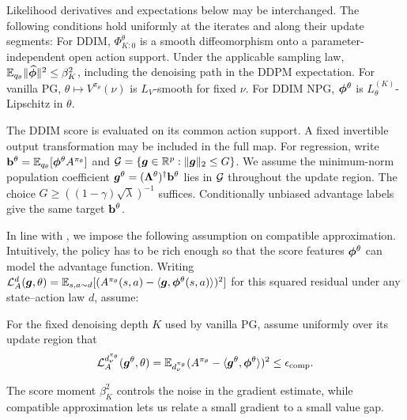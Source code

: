 \begin{aspt}\label{aspt:ddpm-bijection}
Likelihood derivatives and expectations below may be interchanged. The following conditions hold uniformly at the iterates and along their update segments:
For DDIM, $\Phi_{K:0}^\theta$ is a smooth diffeomorphism onto a parameter-independent open action support.
Under the applicable sampling law, $\mathbb{E}_{q_\theta}\|\widehat{\boldsymbol{\phi}}\|^2\leq\beta_K^2$, including the denoising path in the DDPM expectation.
For vanilla PG, $\theta\mapsto V^{\pi_\theta}(\nu)$ is $L_V$-smooth for fixed $\nu$. For DDIM NPG, $\boldsymbol{\phi}^\theta$ is $L^{(K)}_\theta$-Lipschitz in $\theta$.
\end{aspt}
The DDIM score is evaluated on its common action support. A fixed invertible output transformation may be included in the full map.
For regression, write $\mathbf{b}^\theta=\mathbb{E}_{q_\theta}[\boldsymbol{\phi}^\theta A^{\pi_\theta}]$ and ${\mathcal{G}}=\{\bm{g}\in\mathbb R^p:\|\bm{g}\|_2\leq G\}$. We assume the minimum-norm population coefficient $\bm{g}^\theta=(\boldsymbol{\Lambda}^\theta)^\dagger\mathbf{b}^\theta$ lies in ${\mathcal{G}}$ throughout the update region. The choice $G\geq((1-\gamma)\sqrt\lambda)^{-1}$ suffices. Conditionally unbiased advantage labels give the same target $\mathbf{b}^\theta$.



In line with \cite{agarwal2021theory}, we impose the following assumption on compatible approximation. Intuitively, the policy has to be rich enough so that the score features $\boldsymbol{\phi}^\theta$ can model the advantage function. Writing ${\mathcal{L}}_A^d(\bm{g}, \theta) = \mathbb{E}_{s,a \sim d}[(A^{\pi_\theta}(s,a) - \langle \bm{g}, \boldsymbol{\phi}^\theta(s,a) \rangle )^2]$ for this squared residual under any state--action law $d$, assume:
\begin{aspt}\label{aspt:approx-realizability}
For the fixed denoising depth $K$ used by vanilla PG, assume uniformly over its
update region that
\[
{\mathcal{L}}_A^{d_\nu^{\pi_\theta}}(\bm{g}^\theta,\theta)
=\mathbb{E}_{d_\nu^{\pi_\theta}}(A^{\pi_\theta}-\langle\bm{g}^\theta,\boldsymbol{\phi}^\theta\rangle)^2
\leq\epsilon_{\mathrm{comp}}.
\]
\end{aspt}
The score moment $\beta_K^2$ controls the noise in the gradient estimate, while compatible approximation lets us relate a small gradient to a small value gap.

